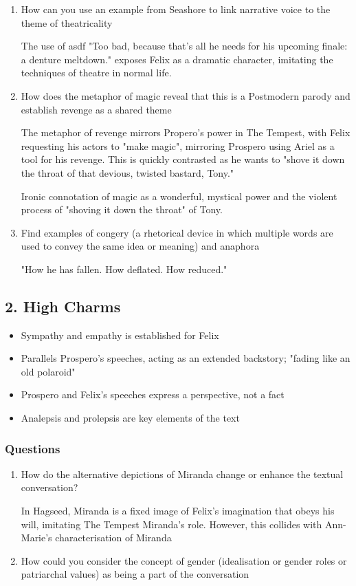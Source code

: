 			\begin{enumerate}
				\item How can you use an example from Seashore to link narrative voice to the theme of theatricality

					The use of asdf "Too bad, because that’s all he needs for his upcoming finale: a denture meltdown." exposes Felix as a dramatic character, imitating the techniques of theatre in normal life.

				\item How does the metaphor of magic reveal that this is a Postmodern parody and establish revenge as a shared theme

					The metaphor of revenge mirrors Propero's power in The Tempest, with Felix requesting his actors to "make magic", mirroring Prospero using Ariel as a tool for his revenge. This is quickly contrasted as he wants to "shove it down the throat of that devious, twisted bastard, Tony."

					Ironic connotation of magic as a wonderful, mystical power and the violent process of "shoving it down the throat" of Tony.
				\item Find examples of congery (a rhetorical device in which multiple words are used to convey the same idea or meaning) and anaphora

					"How he has fallen. How deflated. How reduced."
			\end{enumerate}

	\subsection{2. High Charms}
	
		\begin{itemize}
			\item Sympathy and empathy is established for Felix
			\item Parallels Prospero's speeches, acting as an extended backstory; "fading like an old polaroid"
			\item Prospero and Felix's speeches express a perspective, not a fact
			\item Analepsis and prolepsis are key elements of the text
		\end{itemize}

		\subsubsection{Questions}
		
			\begin{enumerate}
				\item How do the alternative depictions of Miranda change or enhance the textual conversation?

					In Hagseed, Miranda is a fixed image of Felix's imagination that obeys his will, imitating The Tempest Miranda's role. However, this collides with Ann-Marie's characterisation of Miranda

				\item How could you consider the concept of gender (idealisation or gender roles or patriarchal values) as being a part of the conversation
			\end{enumerate}
	
